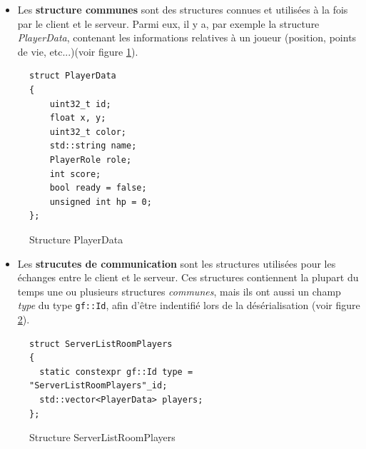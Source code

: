 \documentclass[a4paper, 11pt]{article}
\begin{document}
\begin{itemize}
\item Les \textbf{structure communes} sont des structures connues et utilisées à la fois par le client et le serveur. Parmi eux, il y a, par exemple la structure \textit{PlayerData}, contenant les informations relatives à un joueur (position, points de vie, etc...)(voir figure \ref{fig:player_data}).
\end{itemize}
\vspace{0.3cm}
\begin{figure}[H]
\begin{lstlisting}[xleftmargin=.075\textwidth, xrightmargin=.075\textwidth]
struct PlayerData
{
    uint32_t id;
    float x, y;
    uint32_t color;
    std::string name;
    PlayerRole role;
    int score;
    bool ready = false;
    unsigned int hp = 0;
};
\end{lstlisting}
\caption{Structure PlayerData}
\label{fig:player_data}
\end{figure}
\vspace{0.3cm}
\begin{itemize}
\item Les \textbf{strucutes de communication} sont les structures utilisées pour les échanges entre le client et le serveur. Ces structures contiennent la plupart du temps une ou plusieurs structures \textit{communes}, mais ils ont aussi un champ \textit{type} du type \texttt{gf::Id}, afin d'être indentifié lors de la désérialisation (voir figure \ref{fig:server_list_room_players}).
\end{itemize}
\vspace{0.3cm}
\begin{figure}[H]
\begin{lstlisting}[xleftmargin=.075\textwidth, xrightmargin=.075\textwidth]
struct ServerListRoomPlayers
{
  static constexpr gf::Id type = "ServerListRoomPlayers"_id;
  std::vector<PlayerData> players;
};
\end{lstlisting}
\caption{Structure ServerListRoomPlayers}
\label{fig:server_list_room_players}
\end{figure}
\end{document}
